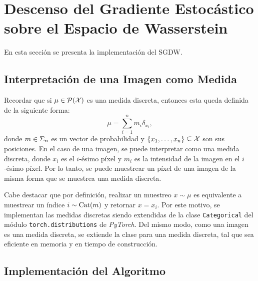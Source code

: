 \section{Descenso del Gradiente Estocástico sobre el Espacio de Wasserstein}\label{sec:sgdw}  %


En esta sección se presenta la implementación del SGDW.

\subsection{Interpretación de una Imagen como Medida}\label{ssec:interpr-imagen-medida}  %

Recordar que si $\mu\in \ProbSpace[\cX] $ es una medida discreta, entonces esta queda definida de la siguiente forma:
\begin{equation}\label{eq:medida-discreta}
    \mu = \sum_{i=1}^{n} m_i \delta_{x_i},
\end{equation}
donde $m \in \Simplex[n]$ es un vector de probabilidad y $ \left\{ x_1, \dots, x_n \right\} \subseteq \cX $ son sus posiciones. En el caso de una imagen, se puede interpretar como una medida discreta, donde $x_i$ es el $i$-ésimo píxel y $m_i$ es la intensidad de la imagen en el $i$-ésimo píxel. Por lo tanto, se puede muestrear un píxel de una imagen de la misma forma que se muestrea una medida discreta.


Cabe destacar que por definición, realizar un muestreo $x \sim \mu$ es equivalente a muestrear un índice $i \sim \Categorical(m)$ y retornar $x = x_i$. Por este motivo, se implementan las medidas discretas siendo extendidas de la clase \texttt{Categorical} del módulo \texttt{torch.distributions} de \textit{PyTorch}. Del mismo modo, como una imagen es una medida discreta, se extiende la clase para una medida discreta, tal que sea eficiente en memoria y en tiempo de construcción.

\subsection{Implementación del Algoritmo}\label{ssec:implementacion-algoritmo}  %

